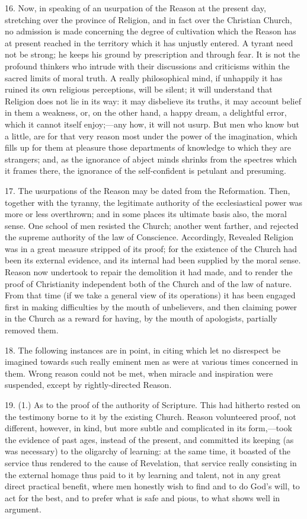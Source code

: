 16. Now, in speaking of an usurpation of the Reason at the present
day, stretching over the province of Religion, and in fact over the
Christian Church, no admission is made concerning the degree of
cultivation which the Reason has at present reached in the territory
which it has unjustly entered. A tyrant need not be strong; he keeps
his ground by prescription and through fear. It is not the profound
thinkers who intrude with their discussions and criticisms within the
sacred limits of moral truth. A really philosophical mind, if
unhappily it has ruined its own religious perceptions, will be silent;
it will understand that Religion does not lie in its way: it may
disbelieve its truths, it may account belief in them a weakness, or,
on the other hand, a happy dream, a delightful error, which it cannot
itself enjoy;—any how, it will not usurp. But men who know but a
little, are for that very reason most under the power of the
imagination, which fills up for them at pleasure those departments of
knowledge to which they are strangers; and, as the ignorance of abject
minds shrinks from the spectres which it frames there, the ignorance
of the self-confident is petulant and presuming.

17. The usurpations of the Reason may be dated from the
Reformation. Then, together with the tyranny, the legitimate authority
of the ecclesiastical power was more or less overthrown; and in some
places its ultimate basis also, the moral sense. One school of men
resisted the Church; another went farther, and rejected the supreme
authority of the law of Conscience. Accordingly, Revealed Religion was
in a great measure stripped of its proof; for the existence of the
Church had been its external evidence, and its internal had been
supplied by the moral sense. Reason now undertook to repair the
demolition it had made, and to render the proof of Christianity
independent both of the Church and of the law of nature. From that
time (if we take a general view of its operations) it has been engaged
first in making difficulties by the mouth of unbelievers, and then
claiming power in the Church as a reward for having, by the mouth of
apologists, partially removed them.

18. The following instances are in point, in citing which let no
disrespect be imagined towards such really eminent men as were at
various times concerned in them. Wrong reason could not be met, when
miracle and inspiration were suspended, except by rightly-directed
Reason.

19. (1.) As to the proof of the authority of Scripture. This had hitherto rested on the testimony borne to it by the existing
Church. Reason volunteered proof, not different, however, in kind, but
more subtle and complicated in its form,—took the evidence of past
ages, instead of the present, and committed its keeping (as was
necessary) to the oligarchy of learning: at the same time, it boasted
of the service thus rendered to the cause of Revelation, that service
really consisting in the external homage thus paid to it by learning
and talent, not in any great direct practical benefit, where men
honestly wish to find and to do God's will, to act for the best, and
to prefer what is safe and pious, to what shows well in argument.

